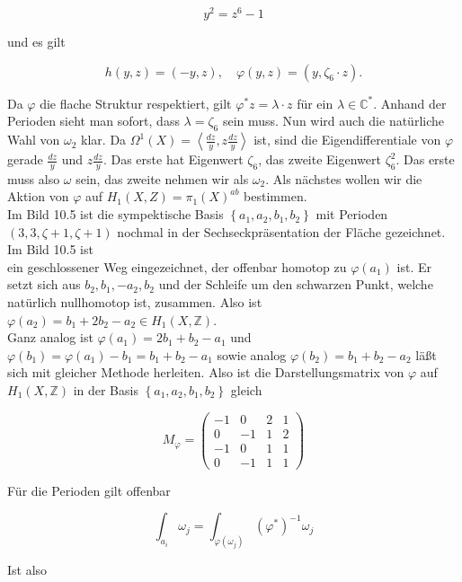 \documentclass[10pt, letterpaper]{article}
\begin{document}
$$
y^{2}=z^{6}-1
$$

und es gilt

$$
h(y, z)=(-y, z), \quad \varphi(y, z)=\left(y, \zeta_{6} \cdot z\right) .
$$

Da $\varphi$ die flache Struktur respektiert, gilt $\varphi^{*} z=\lambda \cdot z$ für ein $\lambda \in \mathbb{C}^{*}$. Anhand der Perioden sieht man sofort, dass $\lambda=\zeta_{6}$ sein muss. Nun wird auch die natürliche Wahl von $\omega_{2}$ klar. Da $\Omega^{1}(X)=\left\langle\frac{d z}{y}, z \frac{d z}{y}\right\rangle$ ist, sind die Eigendifferentiale von $\varphi$ gerade $\frac{d z}{y}$ und $z \frac{d z}{y}$. Das erste hat Eigenwert $\zeta_{6}$, das zweite Eigenwert $\zeta_{6}^{2}$. Das erste muss also $\omega$ sein, das zweite nehmen wir als $\omega_{2}$. Als nächstes wollen wir die Aktion von $\varphi$ auf $H_{1}(X, Z)=\pi_{1}(X)^{a b}$ bestimmen.\\
Im Bild 10.5 ist die sympektische Basis $\left\{a_{1}, a_{2}, b_{1}, b_{2}\right\}$ mit Perioden $(3,3, \zeta+ 1, \zeta+1)$ nochmal in der Sechseckpräsentation der Fläche gezeichnet. Im Bild 10.5 ist\\
ein geschlossener Weg eingezeichnet, der offenbar homotop zu $\varphi\left(a_{1}\right)$ ist. Er setzt sich aus $b_{2}, b_{1},-a_{2}, b_{2}$ und der Schleife um den schwarzen Punkt, welche natürlich nullhomotop ist, zusammen. Also ist $\varphi\left(a_{2}\right)=b_{1}+2 b_{2}-a_{2} \in H_{1}(X, \mathbb{Z})$.\\
Ganz analog ist $\varphi\left(a_{1}\right)=2 b_{1}+b_{2}-a_{1}$ und $\varphi\left(b_{1}\right)=\varphi\left(a_{1}\right)-b_{1}=b_{1}+b_{2}-a_{1}$ sowie analog $\varphi\left(b_{2}\right)=b_{1}+b_{2}-a_{2}$ läßt sich mit gleicher Methode herleiten. Also ist die Darstellungsmatrix von $\varphi$ auf $H_{1}(X, \mathbb{Z})$ in der Basis $\left\{a_{1}, a_{2}, b_{1}, b_{2}\right\}$ gleich

$$
M_{\varphi}=\left(\begin{array}{rrrr}
-1 & 0 & 2 & 1 \\
0 & -1 & 1 & 2 \\
-1 & 0 & 1 & 1 \\
0 & -1 & 1 & 1
\end{array}\right)
$$

Für die Perioden gilt offenbar

$$
\int_{a_{i}} \omega_{j}=\int_{\varphi\left(\omega_{j}\right)}\left(\varphi^{*}\right)^{-1} \omega_{j}
$$

Ist also
\end{document}

